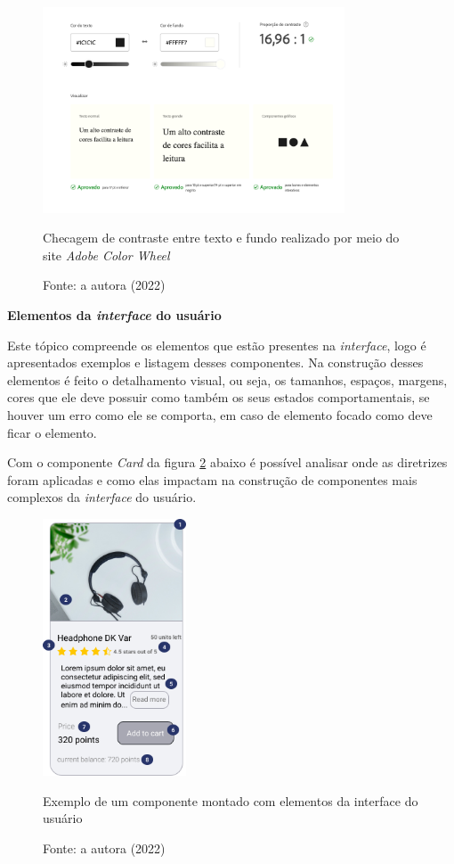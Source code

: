 {\begin{figure}[ht]
    \centering
	\includegraphics[width=0.8\textwidth]{images/contrast_check.png}
    \caption{Checagem de contraste entre texto e fundo realizado por meio do site  \textit{Adobe Color Wheel} \cite{ADOBE}}
    \caption*{Fonte: a autora (2022)}
    \label{fig3:tipografia}
\end{figure} 

\newpage
{\textbf{Elementos da \textit{interface} do usuário}}

Este tópico compreende os elementos que estão presentes na \textit{interface}, logo é apresentados exemplos e listagem desses componentes. Na construção desses elementos é feito o detalhamento visual, ou seja, os tamanhos, espaços, margens, cores que ele deve possuir como também os seus estados comportamentais, se houver um erro como ele se comporta, em caso de elemento focado como deve ficar o elemento.

Com o componente \textit{Card} da figura \ref{fig:UI_componentes} abaixo é possível analisar onde as diretrizes foram aplicadas e como elas impactam na construção de componentes mais complexos da \textit{interface} do usuário.  

\begin{figure}[!htb]
    \centering
	\includegraphics[width=0.38\textwidth]{images/ui-exemplo.png}
    \caption{Exemplo de um componente montado com elementos da interface do usuário}
    \caption*{Fonte: a autora (2022)}
    \label{fig:UI_componentes}
\end{figure}

}
